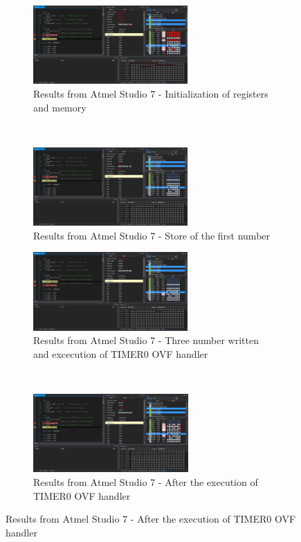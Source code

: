 \documentclass{article}
\begin{document}
	\begin{figure}[h!]
		\centering
		\begin{subfigure}[t]{0.5\textwidth}
			\centering
			\includegraphics[height=3cm, width=\linewidth]{./results/lab3_sim_init.png}
			\caption{Results from Αtmel Studio 7 - Ιnitialization of registers and memory}
		\end{subfigure}%
		~
		\begin{subfigure}[t]{0.5\textwidth}
			\centering
			\includegraphics[height=3cm, width=\linewidth]{./results/lab3_num_instr_a.png}
			\caption{Results from Αtmel Studio 7 - Store of the first number}
		\end{subfigure}
		
		\begin{subfigure}[t]{0.5\textwidth}
			\centering
			\includegraphics[height=3cm, width=\linewidth]{./results/lab3_num_instr_b.png}
			\caption{Results from Αtmel Studio 7 - Three number written and excecution of TIMER0 OVF handler}
		\end{subfigure}%
		~
		\begin{subfigure}[t]{0.5\textwidth}
			\centering
			\includegraphics[height=3cm, width=\linewidth]{./results/lab3_num_instr_c.png}
			\caption{Results from Αtmel Studio 7 - After the execution of TIMER0 OVF handler}
		\end{subfigure}	
		

\end{figure}
\end{document}
